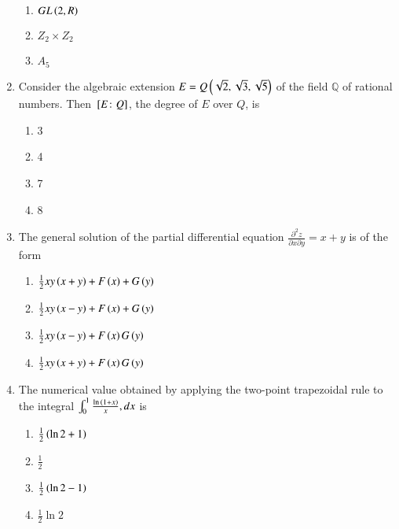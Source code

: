 \documentclass[journal]{IEEEtran}
\begin{document}
\begin{enumerate}
\begin{multicols}{2}
\begin{enumerate}
        \item $GL\left(2,R\right)$
        \item $Z_2 \times Z_2$
        \item $A_5$
\end{enumerate}
\end{multicols}
\item Consider the algebraic extension $E = Q \left(\sqrt{2}, \sqrt{3}, \sqrt{5}\right)$ of the field $\mathbb{Q}$ of rational numbers. Then ${}\left[E \colon Q\right]$, the degree of $E$ over $Q$, is
\begin{multicols}{2}
    \begin{enumerate}
        \item 3
        \item 4
        \item 7
        \item 8
    \end{enumerate}
\end{multicols}

\item The general solution of the partial differential equation $\frac{\partial^2 z}{\partial x \partial y} = x + y$ is of the form
\begin{multicols}{2}
    \begin{enumerate}
        \item $\frac{1}{2} xy \left(x+y\right) + F\left(x\right) + G\left(y\right)$
        \item $\frac{1}{2} xy \left(x-y\right) + F\left(x\right) + G\left(y\right)$
        \item $\frac{1}{2} xy \left(x-y\right) + F\left(x\right) G\left(y\right)$
        \item $\frac{1}{2} xy \left(x+y\right) + F\left(x\right) G\left(y\right)$
    \end{enumerate}
\end{multicols}

\item The numerical value obtained by applying the two-point trapezoidal rule to the integral $\int_0^1 \frac{\ln{\ensuremath{\left(1+x\right)}}}{x}, dx$ is
\begin{multicols}{2}
    \begin{enumerate}
        \item $\frac{1}{2} \left(\ln{2}+1\right)$
        \item $\frac{1}{2}$
        \item $\frac{1}{2} \left(\ln{2}-1\right)$
        \item $\frac{1}{2} \ln{2}$
    \end{enumerate}
\end{multicols}


\end{enumerate}
\end{document}
